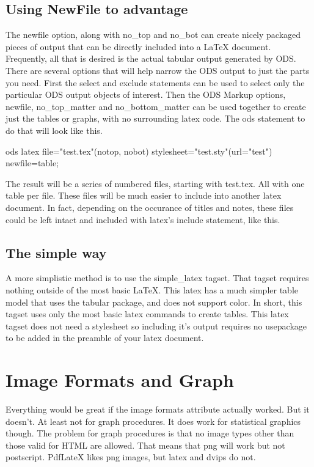 \subsection{Using NewFile to advantage}
The newfile option, along with no\_top and no\_bot can create nicely 
packaged pieces of output that can be directly included into a LaTeX
document.
Frequently, all that is desired is the actual tabular output generated by
ODS.  There are several options that will help narrow the ODS output to
just the parts you need.  First the select and exclude statements can be
used to select only the particular ODS output objects of interest.  Then
the ODS Markup options, newfile, no\_top\_matter  and no\_bottom\_matter can
be used together to create just the tables or graphs, with no surrounding
latex code.  The ods statement to do that will look like this.

\begin{sfvcode}
     ods latex file="test.tex"(notop, nobot)
               stylesheet="test.sty"(url="test")
               newfile=table;
\end{sfvcode}

The result will be a series of numbered files, starting with test.tex.  
All with one table per file.  These files will be much easier to include
into another latex document.  In fact, depending on the occurance of titles
and notes, these files could be left intact and included with latex's 
include statement, like this.  

\begin{sfvcode}
   
\end{sfvcode}

\subsection{The simple way}
A more simplistic method is to use the simple\_latex tagset.  That tagset
requires nothing outside of the most basic LaTeX.  This latex has a much 
simpler table model that uses the tabular package, and does not support color.
In short, this tagset uses only the most basic latex commands to create tables.
This latex tagset does not need a stylesheet so 
including it's output requires no usepackage to be added in the preamble of your
latex document.  

\section{Image Formats and Graph}
Everything would be great if the image formats attribute actually worked. 
But it doesn't.  At least not for graph procedures.  It does work for
statistical graphics though.  The problem for graph procedures is that
no image types other than those valid for HTML are allowed.  That means
that png will work but not postscript.  PdfLateX likes png images, but
latex and dvips do not.  


